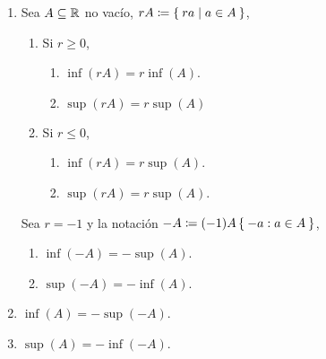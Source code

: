 \begin{enumerate}[label=\alph*)]
  \item Sea $A\subseteq \mathbb{R}$ no vacío, $rA \coloneqq \Set{r a| a\in A}$,
  \begin{enumerate}[label=\Roman*)]
    \item Si $r\geq 0$,
    \begin{enumerate}[label=\roman*)]
      \item $\inf(r A) = r\inf(A)$.
      \item $\sup(r A) = r\sup(A)$
    \end{enumerate}
    \item Si $r\leq 0$,
    \begin{enumerate}[label=\roman*)]
      \item $\inf(rA)=r\sup(A)$.
      \item $\sup(rA)=r\sup(A)$.
    \end{enumerate}
  \end{enumerate}
   Sea $r=-1$ y la notación $-A\coloneqq (-1)A\Set{-a:a\in A}$,
  \begin{enumerate}[label=\roman*)]
  \item $\inf(-A) = -\sup(A)$.
  \item $\sup(-A) = -\inf(A)$.
  \end{enumerate}
  
  \item $\inf(A)=-\sup(-A)$.
  \item $\sup(A)=-\inf(-A)$.
  
\end{enumerate}